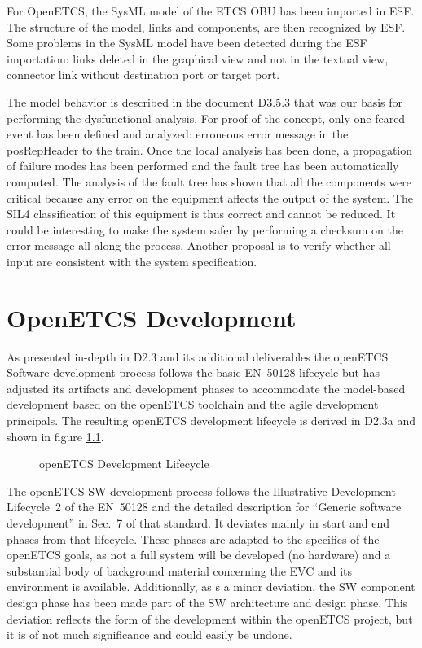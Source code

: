 \documentclass{template/openetcs_report}
\begin{document}
For OpenETCS, the SysML model of the ETCS OBU has been imported in ESF. The structure of the model, links and components, are then recognized by ESF. Some problems in the SysML model have been detected during the ESF importation: links deleted in the graphical view and not in the textual view, connector link without destination port or target port.

The model behavior is described in the document D3.5.3 that was our basis for performing the dysfunctional analysis. For proof of the concept, only one feared event has been defined and analyzed: erroneous error message in the posRepHeader to the train. Once the local analysis has been done, a propagation of failure modes has been performed and the fault tree has been automatically computed. 
The analysis of the fault tree has shown that all the components were critical because any error on the equipment affects the output of the system. The SIL4 classification of this equipment is thus correct and cannot be reduced. It could be interesting to make the system safer by performing a checksum on the error message all along the process. Another proposal is to verify whether all input are consistent with the system specification.



\chapter{OpenETCS Development}
\label{sec:development-process}

As presented in-depth in D2.3 and its additional deliverables the openETCS Software development process follows the basic EN~50128 lifecycle but has adjusted its artifacts and development phases to accommodate the model-based development based on the openETCS toolchain and the agile development principals. The resulting openETCS development lifecycle is derived in D2.3a and shown in figure \ref{fig:lifecycle2}.

\begin{figure}[hbt]
  \centering
  \def\svgwidth{.9\textwidth}
  {\tiny
  }
  \caption{openETCS Development Lifecycle}
  \label{fig:lifecycle2}
\end{figure}



The openETCS SW development process follows the Illustrative
Development Lifecycle~2 \cite[Fig.~4]{EN50128:2011} of the EN~50128
and the detailed description for ``Generic software development'' in
Sec.~7 of that standard. It deviates mainly in start and end phases
from that lifecycle. These phases are adapted to the specifics of the
openETCS goals, as not a full system will be developed (no hardware)
and a substantial body of background material concerning the EVC and
its environment is available. Additionally, as s a minor deviation,
the SW component design phase has been made part of the SW
architecture and design phase. This deviation reflects the form of the
development within the openETCS project, but it is of not much
significance and could easily be undone.
\end{document}
